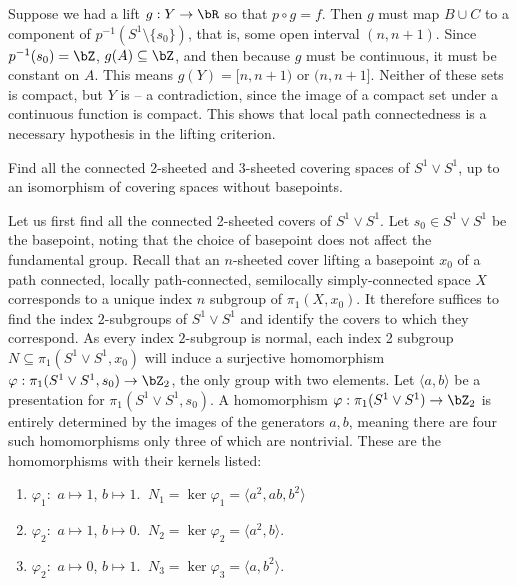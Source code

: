 \begin{homework}[e]
\begin{prf}
    Suppose we had a lift $g:Y\to \bR$ so that $p\circ g = f$. Then $g$ must map $B\cup C$ to a component of $p^{-1}(S^1\setminus \{s_0\})$, that is, some open interval $(n,n+1)$. Since $p^{-1}(s_0) = \bZ$, $g(A) \subseteq \bZ$, and then because $g$ must be continuous, it must be constant on $A$. This means $g(Y) = [n,n+1)$ or $(n,n+1]$. Neither of these sets is compact, but $Y$ is -- a contradiction, since the image of a compact set under a continuous function is compact. This shows that local path connectedness is a necessary hypothesis in the lifting criterion.
  \end{prf}

   Find all the connected 2-sheeted and 3-sheeted covering spaces of $S^1 \vee S^1$, up to an isomorphism of covering spaces without basepoints. 

  \begin{prf}
    Let us first find all the connected 2-sheeted covers of $S^1\vee S^1$. Let $s_0\in S^1\vee S^1$ be the basepoint, noting that the choice of basepoint does not affect the fundamental group. Recall that an $n$-sheeted cover lifting a basepoint $x_0$ of a path connected, locally path-connected, semilocally simply-connected space $X$ corresponds to a unique index $n$ subgroup of $\pi_1(X,x_0)$. It therefore suffices to find the index $2$-subgroups of $S^1\vee S^1$ and identify the covers to which they correspond. As every index $2$-subgroup is normal, each index 2 subgroup $N \subseteq \pi_1(S^1\vee S^1,x_0)$ will induce a surjective homomorphism $\varphi:\pi_1(S^1\vee S^1, s_0)\to \bZ_2$, the only group with two elements. Let $\langle a,b \rangle$ be a presentation for $\pi_1(S^1\vee S^1,s_0)$. A homomorphism $\varphi:\pi_1(S^1\vee S^1)\to \bZ_2$ is entirely determined by the images of the generators $a,b$, meaning there are four such homomorphisms only three of which are nontrivial. These are the homomorphisms with their kernels listed:
    \begin{enumerate}[(1)]
      \item $\varphi_1: $ $a \mapsto 1$, $b \mapsto 1$. $~N_1 = \ker \varphi_1 = \langle a^2, ab, b^2 \rangle$
      \item $\varphi_2: $ $a\mapsto 1$, $b\mapsto 0$. $~N_2 = \ker \varphi_2 = \langle a^2,b \rangle$.
      \item $\varphi_2: $ $a\mapsto 0$, $b\mapsto 1$. $~N_3 = \ker \varphi_3 = \langle a,b^2 \rangle$.
    \end{enumerate}
    

\end{prf}
\end{homework}
